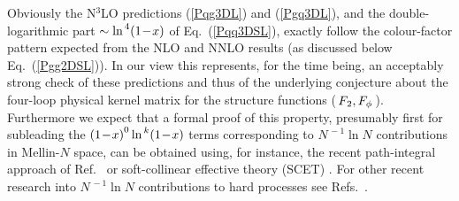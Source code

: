 \documentclass[12pt]{article}
\begin{document}
Obviously the N$^3$LO predictions (\ref{Pqg3DL}) and (\ref{Pgq3DL}), and the 
double-logarithmic part $\sim \ln^{\,4} \! \x1$ of Eq.~(\ref{Pqq3DSL}), exactly
follow the colour-factor pattern expected from the NLO and NNLO results (as
discussed below Eq.~(\ref{Pgg2DSL})). In our view this represents, for the time
being, an acceptably strong check of these predictions and thus of the 
underlying conjecture about the four-loop physical kernel matrix for the 
structure functions ($\,{F_{\:\! 2}}, F_\phi\,$). Furthermore we expect that a 
formal proof of this property, presumably first for subleading the 
$\x1^{0} \ln^{\,k}\! \x1$ terms corresponding to $N^{\,-1} \ln N$ contributions
in Mellin-$N$ space, can be obtained using, for instance, the recent 
path-integral approach of Ref.~\cite{Laenen:2008gt} or soft-collinear
effective theory (SCET) \cite{SCET}. For other recent research into 
$N^{\,-1} \ln N$ contributions to hard processes see Refs.~\cite{OneoverN}.
\end{document}
